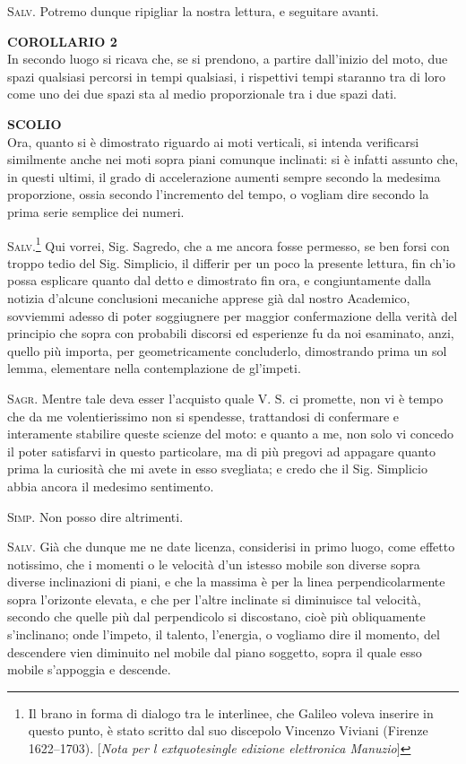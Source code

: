 \documentclass[11pt,twoside,openany]{book}
\newcommand{\speaker}[1]{\textcolor{rubric}{\textsc{#1}}\space}
\begin{document}
\speaker{Salv.} Potremo dunque ripigliar la nostra lettura, e seguitare avanti.

\textbf{COROLLARIO 2}\\ In secondo luogo si ricava che, se si prendono, a partire dall'inizio del moto, due spazi qualsiasi percorsi in tempi qualsiasi, i rispettivi tempi staranno tra di loro come uno dei due spazi sta al medio proporzionale tra i due spazi dati.

\textbf{SCOLIO}\\ Ora, quanto si è dimostrato riguardo ai moti verticali, si intenda verificarsi similmente anche nei moti sopra piani comunque inclinati: si è infatti assunto che, in questi ultimi, il grado di accelerazione aumenti sempre secondo la medesima proporzione, ossia secondo l'incremento del tempo, o vogliam dire secondo la prima serie semplice dei numeri.

\speaker{Salv.}\footnote{Il brano in forma di dialogo tra le interlinee, che Galileo voleva inserire in questo punto, è stato scritto dal suo discepolo Vincenzo Viviani (Firenze 1622--1703). [\emph{Nota per l extquotesingle edizione elettronica Manuzio}]} Qui vorrei, Sig. Sagredo, che a me ancora fosse permesso, se ben forsi con troppo tedio del Sig. Simplicio, il differir per un poco la presente lettura, fin ch'io possa esplicare quanto dal detto e dimostrato fin ora, e congiuntamente dalla notizia d'alcune conclusioni mecaniche apprese già dal nostro Academico, sovviemmi adesso di poter soggiugnere per maggior confermazione della verità del principio che sopra con probabili discorsi ed esperienze fu da noi esaminato, anzi, quello più importa, per geometricamente concluderlo, dimostrando prima un sol lemma, elementare nella contemplazione de gl'impeti.

\speaker{Sagr.} Mentre tale deva esser l'acquisto quale V. S. ci promette, non vi è tempo che da me volentierissimo non si spendesse, trattandosi di confermare e interamente stabilire queste scienze del moto: e quanto a me, non solo vi concedo il poter satisfarvi in questo particolare, ma di più pregovi ad appagare quanto prima la curiosità che mi avete in esso svegliata; e credo che il Sig. Simplicio abbia ancora il medesimo sentimento.

\speaker{Simp.} Non posso dire altrimenti.

\speaker{Salv.} Già che dunque me ne date licenza, considerisi in primo luogo, come effetto notissimo, che i momenti o le velocità d'un istesso mobile son diverse sopra diverse inclinazioni di piani, e che la massima è per la linea perpendicolarmente sopra l'orizonte elevata, e che per l'altre inclinate si diminuisce tal velocità, secondo che quelle più dal perpendicolo si discostano, cioè più obliquamente s'inclinano; onde l'impeto, il talento, l'energia, o vogliamo dire il momento, del descendere vien diminuito nel mobile dal piano soggetto, sopra il quale esso mobile s'appoggia e descende.
\end{document}

